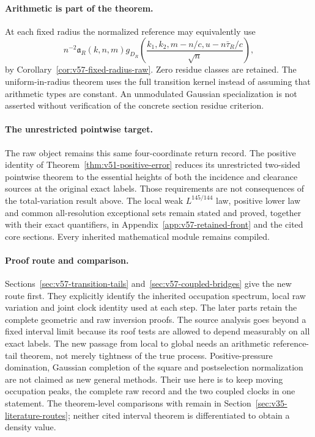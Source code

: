 \paragraph{Arithmetic is part of the theorem.}
At each fixed radius the normalized reference may equivalently use
\[
 n^{-2}\mathfrak a_R(k,n,m)g_{D_R}
  \left(\frac{k_1,k_2,m-n/c,u-n\bar\tau_R/c}{\sqrt n}\right),
\]
by Corollary~\ref{cor:v57-fixed-radius-raw}. Zero residue classes are
retained. The uniform-in-radius theorem uses the full transition
kernel instead of assuming that arithmetic types are constant.
An unmodulated Gaussian specialization is not asserted without
verification of the concrete section residue criterion.

\paragraph{The unrestricted pointwise target.}
The raw object remains this same four-coordinate return record. The
positive identity of Theorem~\ref{thm:v51-positive-error} reduces its
unrestricted two-sided pointwise theorem to the essential heights of
both the incidence and clearance sources at the original exact labels.
Those requirements are not consequences of the total-variation result
above. The local weak $L^{145/144}$ law, positive lower law and common
all-resolution exceptional sets remain stated and proved, together
with their exact quantifiers, in
Appendix~\ref{app:v57-retained-front} and the cited core sections.
Every inherited mathematical module remains compiled.

\paragraph{Proof route and comparison.}
Sections~\ref{sec:v57-transition-tails} and~\ref{sec:v57-coupled-bridges}
give the new route first. They explicitly identify the inherited
occupation spectrum, local raw variation and joint clock identity used
at each step. The later parts retain the complete geometric and raw
inversion proofs. The source analysis goes beyond a fixed interval
limit because its roof tests are allowed to depend measurably on all
exact labels. The new passage from local to global needs an arithmetic
reference-tail theorem, not merely tightness of the true process.
Positive-pressure domination, Gaussian completion of the square and
postselection normalization are not claimed as new general methods.
Their use here is to keep moving occupation peaks, the complete raw
record and the two coupled clocks in one statement. The theorem-level
comparisons with \cite{DPZ,DN} remain in
Section~\ref{sec:v35-literature-routes}; neither cited interval theorem
is differentiated to obtain a density value.

